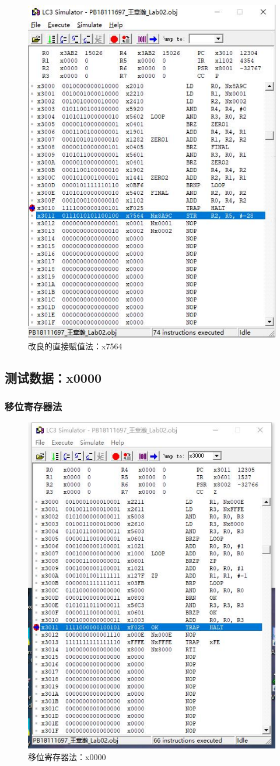 \documentclass[UTF8]{article}
\begin{document}
\begin{figure}[H]
\begin{minipage}[H]{0.48\linewidth}
			\includegraphics[scale=0.4]{x7564_3.jpg}
			\caption{改良的直接赋值法：x7564}
			\label{x7564_3}
		\end{minipage}
	\end{figure}
	
	\subsection{测试数据：x0000}
	\subsubsection{移位寄存器法}
	\begin{figure}[H]
		\centering
		\includegraphics[width=0.4\linewidth]{x0000_1.jpg}
		\caption{移位寄存器法：x0000}
		\label{x0000_1}
	\end{figure}\par
\end{document}
